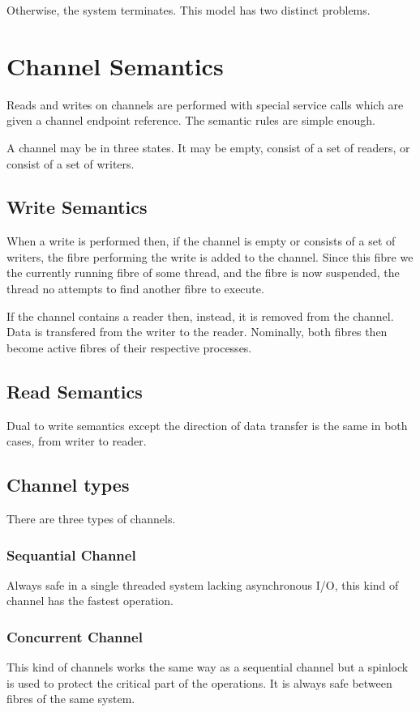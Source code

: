 \documentclass[oneside]{book}
\begin{document}
Otherwise, the system terminates. This model has two distinct problems.



\section{Channel Semantics}
Reads and writes on channels are performed with special service calls
which are given a channel endpoint reference. The semantic rules
are simple enough.

A channel may be in three states. It may be empty, consist of a set
of readers, or consist of a set of writers.

\subsection{Write Semantics}
When a write is performed then, if the channel is empty or consists 
of a set of writers, the fibre performing the write is added to the channel.
Since this fibre we the currently running fibre of some thread, and the
fibre is now suspended, the thread no attempts to find another 
fibre to execute.

If the channel contains a reader then, instead, it is removed from
the channel. Data is transfered from the writer to the reader.
Nominally, both fibres then become active fibres of their 
respective processes.

\subsection{Read Semantics}
Dual to write semantics except the direction of data transfer is the same
in both cases, from writer to reader.


\subsection{Channel types}
There are three types of channels.

\subsubsection{Sequantial Channel}
Always safe in a single threaded system lacking asynchronous I/O,
this kind of channel has the fastest operation.

\subsubsection{Concurrent Channel}
This kind of channels works the same way as a sequential
channel but a spinlock is used to protect the critical part
of the operations. It is always safe between fibres of the same system.
\end{document}
